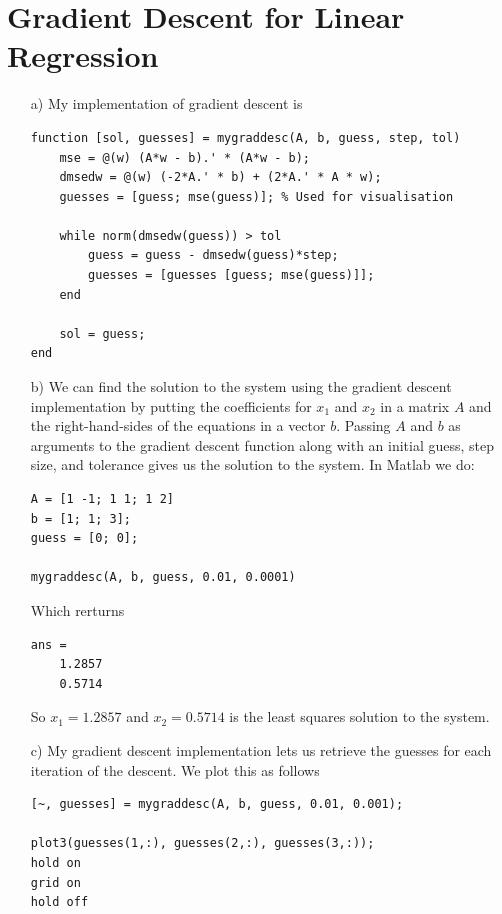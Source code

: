 \documentclass[11pt]{article}
\begin{document}
\section{Gradient Descent for Linear Regression}
\begin{itemize}
    \item[a)]
        My implementation of gradient descent is
        \begin{lstlisting}
function [sol, guesses] = mygraddesc(A, b, guess, step, tol)
    mse = @(w) (A*w - b).' * (A*w - b);
    dmsedw = @(w) (-2*A.' * b) + (2*A.' * A * w);
    guesses = [guess; mse(guess)]; % Used for visualisation
    
    while norm(dmsedw(guess)) > tol
        guess = guess - dmsedw(guess)*step;
        guesses = [guesses [guess; mse(guess)]];
    end
    
    sol = guess;
end
        \end{lstlisting}
    
    \item[b)]
        We can find the solution to the system using the gradient descent implementation by putting the coefficients for $x_1$ and $x_2$ in a matrix $A$ and the right-hand-sides of the equations in a vector $b$. Passing $A$ and $b$ as arguments to the gradient descent function along with an initial guess, step size, and tolerance gives us the solution to the system. In Matlab we do:
        
        \begin{lstlisting}
A = [1 -1; 1 1; 1 2]
b = [1; 1; 3];
guess = [0; 0];

mygraddesc(A, b, guess, 0.01, 0.0001)
        \end{lstlisting}
        
        Which rerturns
        \begin{lstlisting}
ans =
    1.2857
    0.5714
        \end{lstlisting}
        
        So $x_1 = 1.2857$ and $x_2 = 0.5714$ is the least squares solution to the system.
        
    \item[c)]
        My gradient descent implementation lets us retrieve the guesses for each iteration of the descent. We plot this as follows
        \begin{lstlisting}
[~, guesses] = mygraddesc(A, b, guess, 0.01, 0.001);

plot3(guesses(1,:), guesses(2,:), guesses(3,:));
hold on
grid on
hold off
        \end{lstlisting}


\end{itemize}
\end{document}
